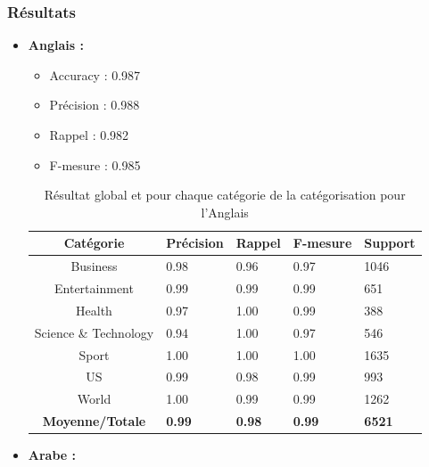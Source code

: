         \subsubsection{Résultats}
        \begin{itemize}
            \item{\textbf{Anglais :}}
            \begin{itemize}
                \item{Accuracy : 0.987}
                \item{Précision : 0.988}
                \item{Rappel : 0.982}
                \item{F-mesure : 0.985}
            \end{itemize}
            \begin{table}[H]
                    \begin{center}
                        \begin{tabular}{|c|C{2cm}|C{2cm}|C{2cm}|C{2cm}|}
                            \hline
                            \textbf{Catégorie} &  \textbf{Précision} &  \textbf{Rappel} &  \textbf{F-mesure} &  \textbf{Support} \\
                            \hline
                            Business & 0.98 & 0.96 & 0.97 & 1046 \\
                            Entertainment & 0.99 & 0.99 & 0.99 & 651 \\
                            Health & 0.97 & 1.00 & 0.99 & 388 \\
                            Science \& Technology & 0.94 & 1.00 & 0.97 & 546 \\
                            Sport & 1.00 & 1.00 & 1.00 & 1635 \\
                            US & 0.99 & 0.98 & 0.99 & 993 \\
                            World & 1.00 & 0.99 & 0.99 & 1262 \\                          
                            \textbf{Moyenne/Totale} & \textbf{0.99} & \textbf{0.98} & \textbf{0.99} & \textbf{6521} \\
                            \hline
                        \end{tabular}
                    \end{center}
                    \caption{Résultat global et pour chaque catégorie de la catégorisation pour l'Anglais}
            \end{table}
            \item{\textbf{Arabe :}}

\end{itemize}
